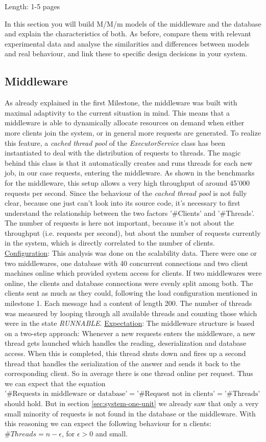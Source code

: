 \documentclass[11pt]{article}
\begin{document}
Length: 1-5 pages

In this section you will build M/M/m models of the middleware and the database and explain the characteristics of both. As before, compare them with relevant experimental data and analyse the similarities and differences between models and real behaviour, and link these to specific design decisions in your system.

\subsection{Middleware}\label{sec:mw}
As already explained in the first Milestone, the middleware was built with maximal adaptivity to the current situation in mind. This means that a middleware is able to dynamically allocate resources on demand when either more clients join the system, or in general more requests are generated. To realize this feature, a \textit{cached thread pool} of the \textit{ExecutorService} class has been instantiated to deal with the distribution of requests to threads. The magic behind this class is that it automatically creates and runs threads for each new job, in our case requests, entering the middleware. As shown in the benchmarks for the middleware, this setup allows a very high throughput of around 45'000 requests per second. Since the behaviour of the \textit{cached thread pool} is not fully clear, because one just can't look into its source code, it's necessary to first understand the relationship between the two factors '\#Clients' and '\#Threads'. The number of requests is here not important, because it's not about the throughput (i.e. requests per second), but about the number of requests currently in the system, which is directly correlated to the number of clients.
\newline\underline{Configuration}: This analysis was done on the scalability data. There were one or two middlewares, one database with 40 concurrent connections and two client machines online which provided system access for clients. If two middlewares were online, the clients and database connections were evenly split among both. The clients sent as much as they could, following the load configuration mentioned in milestone 1. Each message had a content of length 200. The number of threads was measured by looping through all available threads and counting those which were in the state \textit{RUNNABLE}.
\newline\underline{Expectation}: The middleware structure is based on a two-step approach: Whenever a new requests enters the middleware, a new thread gets launched which handles the reading, deserialization and database access. When this is completed, this thread shuts down and fires up a second thread that handles the serialization of the answer and sends it back to the corresponding client. So in average there is one thread online per request. Thus we can expect that the equation $\text{'\#Requests in middleware or database'}=\text{'\#Request not in clients'}=\text{'\#Threads'}$ should hold. But in section \ref{sec:system-one-unit} we already saw that only a very small minority of requests is not found in the database or the middleware. With this reasoning we can expect the following behaviour for n clients: $\#Threads=n-\epsilon$, for $\epsilon>0$ and small.
\end{document}

